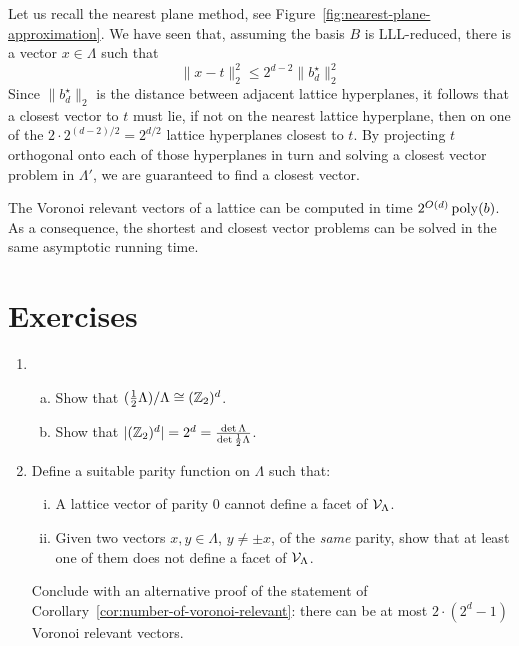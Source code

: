 Let us recall the nearest plane method, see Figure~\ref{fig:nearest-plane-approximation}.
We have seen that, assuming the basis $B$ is LLL-reduced,
there is a vector $x \in \Lambda$ such that
\[
  \|x-t\|_2^2 \leq 2^{d-2} \|b_d^\star\|_2^2
\]
Since $\|b_d^\star\|_2$ is the distance between adjacent lattice hyperplanes,
it follows that a closest vector to $t$ must lie,
if not on the nearest lattice hyperplane,
then on one of the $2 \cdot 2^{(d-2)/2} = 2^{d/2}$ lattice hyperplanes closest to $t$.
By projecting $t$ orthogonal onto each of those hyperplanes in turn
and solving a closest vector problem in $\Lambda'$,
we are guaranteed to find a closest vector.

\begin{theorem}
  The Voronoi relevant vectors of a lattice can be computed in time $2^{O(d)} \operatorname{poly}(b)$.
  As a consequence, the shortest and closest vector problems can be solved in the same asymptotic
  running time.
\end{theorem}






\section*{Exercises}

\begin{enumerate}
  \item
    \begin{enumerate}[(a)]
    \item Show that $(\frac{1}{2} \Lambda) / \Lambda \cong (\mathbb{Z}_2)^d$.

    \item Show that $|(\mathbb{Z}_2)^d| = 2^d = \frac{\det\Lambda}{\det \frac{1}{2} \Lambda}$.
    \end{enumerate}

  \item
    Define a suitable parity function on $\Lambda$ such that:
    \begin{enumerate}[(i)]
      \item A lattice vector of parity $0$ cannot define a facet of $\mathcal{V}_\Lambda$.

      \item Given two vectors $x, y \in \Lambda$, $y \neq \pm x$, of the \emph{same} parity,
        show that at least one of them does not define a facet of $\mathcal{V}_\Lambda$.
    \end{enumerate}
    Conclude with an alternative proof of the statement of Corollary~\ref{cor:number-of-voronoi-relevant}:
    there can be at most $2 \cdot (2^d - 1)$ Voronoi relevant vectors.
\end{enumerate}
